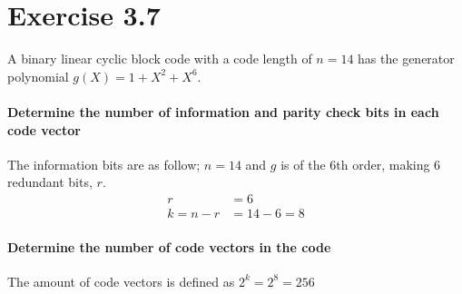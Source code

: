 \documentclass[Main]{subfiles}
\begin{document}
\section{Exercise 3.7}

A binary linear cyclic block code with a code length of $n = 14$ has the generator polynomial $g(X) = 1 + X^2 + X^6$.

\paragraph{Determine the number of information and parity check bits in each code vector}
The information bits are as follow; $n =14$ and $g$ is of the 6th order, making 6 redundant bits, $r$.
\begin{align}
r &= 6\\
k = n-r &= 14-6 = 8
\end{align}



\paragraph{Determine the number of code vectors in the code}
The amount of code vectors is defined as $2^k = 2^8 = 256$
\end{document}
